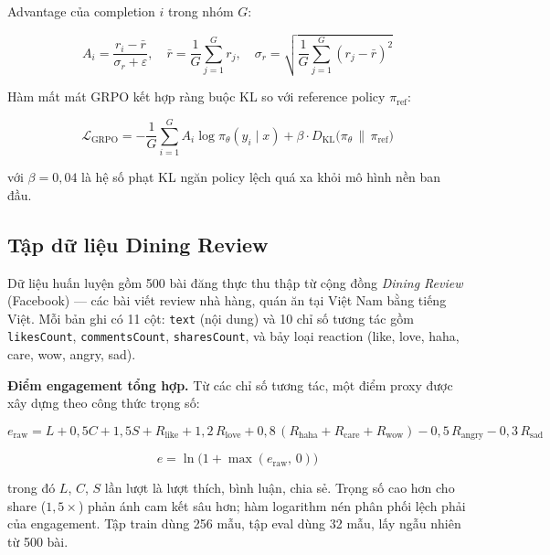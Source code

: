 Advantage của completion $i$ trong nhóm $G$:

\begin{equation}
  A_i = \frac{r_i - \bar{r}}{\sigma_r + \varepsilon}, \quad
  \bar{r} = \frac{1}{G}\sum_{j=1}^{G} r_j, \quad
  \sigma_r = \sqrt{\frac{1}{G}\sum_{j=1}^{G}(r_j - \bar{r})^2}
  \label{eq:grpo-advantage}
\end{equation}

Hàm mất mát GRPO kết hợp ràng buộc KL so với reference policy
$\pi_{\text{ref}}$:

\begin{equation}
  \mathcal{L}_{\text{GRPO}}
    = -\frac{1}{G}\sum_{i=1}^{G} A_i \log \pi_\theta(y_i \mid x)
    + \beta \cdot D_{\text{KL}}\!\bigl(\pi_\theta \,\|\, \pi_{\text{ref}}\bigr)
  \label{eq:grpo-loss}
\end{equation}

với $\beta = 0{,}04$ là hệ số phạt KL ngăn policy lệch quá xa khỏi
mô hình nền ban đầu.

\subsection{Tập dữ liệu Dining Review}

Dữ liệu huấn luyện gồm 500 bài đăng thực thu thập từ cộng đồng
\emph{Dining Review} (Facebook) --- các bài viết review nhà hàng,
quán ăn tại Việt Nam bằng tiếng Việt. Mỗi bản ghi có 11 cột:
\texttt{text} (nội dung) và 10 chỉ số tương tác gồm
\texttt{likesCount}, \texttt{commentsCount}, \texttt{sharesCount},
và bảy loại reaction (like, love, haha, care, wow, angry, sad).

\textbf{Điểm engagement tổng hợp.} Từ các chỉ số tương tác, một
điểm proxy được xây dựng theo công thức trọng số:

\begin{equation}
  e_{\text{raw}} = L + 0{,}5C + 1{,}5S
    + R_{\text{like}} + 1{,}2\,R_{\text{love}}
    + 0{,}8\,(R_{\text{haha}} + R_{\text{care}} + R_{\text{wow}})
    - 0{,}5\,R_{\text{angry}} - 0{,}3\,R_{\text{sad}}
  \label{eq:engage-raw}
\end{equation}

\begin{equation}
  e = \ln\!\bigl(1 + \max(e_{\text{raw}},\, 0)\bigr)
  \label{eq:engage-log}
\end{equation}

trong đó $L$, $C$, $S$ lần lượt là lượt thích, bình luận, chia sẻ.
Trọng số cao hơn cho share ($1{,}5\times$) phản ánh cam kết sâu hơn;
hàm logarithm nén phân phối lệch phải của engagement. Tập train
dùng 256 mẫu, tập eval dùng 32 mẫu, lấy ngẫu nhiên từ 500 bài.


